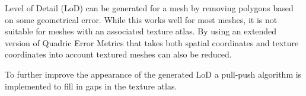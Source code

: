 
Level of Detail (LoD) can be generated for a mesh by removing polygons based on some geometrical error. While this works well for most meshes, it is not suitable for meshes with an associated texture atlas. By using an extended version of Quadric Error Metrics that takes both spatial coordinates and texture coordinates into account textured meshes can also be reduced.

To further improve the appearance of the generated LoD a pull-push algorithm is implemented to fill in gaps in the texture atlas.




